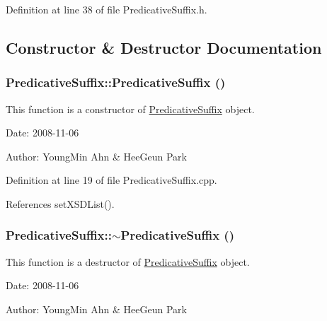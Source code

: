 Definition at line 38 of file PredicativeSuffix.h.

\subsection{Constructor \& Destructor Documentation}
\hypertarget{classkmaOrange_1_1PredicativeSuffix_e6af0d4e25391737834521bff61267ea}{
\subsubsection[{PredicativeSuffix}]{\setlength{\rightskip}{0pt plus 5cm}PredicativeSuffix::PredicativeSuffix ()}}
\label{classkmaOrange_1_1PredicativeSuffix_e6af0d4e25391737834521bff61267ea}


This function is a constructor of \hyperlink{classkmaOrange_1_1PredicativeSuffix}{PredicativeSuffix} object. 

\begin{Desc}
\item[Date:]2008-11-06 \end{Desc}
\begin{Desc}
\item[Author:]YoungMin Ahn \& HeeGeun Park \end{Desc}


Definition at line 19 of file PredicativeSuffix.cpp.

References setXSDList().\hypertarget{classkmaOrange_1_1PredicativeSuffix_e18bf02cb3dee60bb228824f4b319ff4}{
\subsubsection[{$\sim$PredicativeSuffix}]{\setlength{\rightskip}{0pt plus 5cm}PredicativeSuffix::$\sim$PredicativeSuffix ()}}
\label{classkmaOrange_1_1PredicativeSuffix_e18bf02cb3dee60bb228824f4b319ff4}


This function is a destructor of \hyperlink{classkmaOrange_1_1PredicativeSuffix}{PredicativeSuffix} object. 

\begin{Desc}
\item[Date:]2008-11-06 \end{Desc}
\begin{Desc}
\item[Author:]YoungMin Ahn \& HeeGeun Park \end{Desc}


